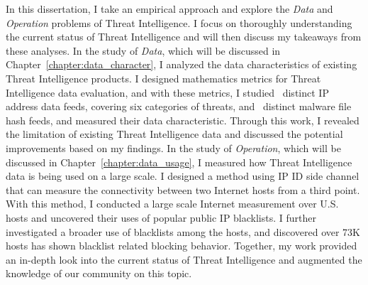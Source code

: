 In this dissertation, I take an empirical approach and explore the 
\textit{Data} and \textit{Operation} problems of Threat Intelligence.
I focus on thoroughly understanding the current status of Threat 
Intelligence and will then discuss my takeaways from these analyses.
In the study of \textit{Data}, which will be discussed in Chapter~\ref{chapter:data_character}, 
I analyzed the data characteristics of existing Threat Intelligence products.
I designed mathematics metrics for Threat Intelligence data evaluation,
and with these metrics, I studied \numipfeeds\ distinct IP address 
data feeds, covering six categories of threats, and \numhashfeeds\ distinct
malware file hash feeds, and measured their data characteristic. Through this
work, I revealed the limitation of existing Threat Intelligence data and 
discussed the potential improvements based on my findings. In the study of
\textit{Operation}, which will be discussed in Chapter~\ref{chapter:data_usage},
I measured how Threat Intelligence data is being used on a large scale. 
I designed a method using IP ID side channel that can measure the 
connectivity between two Internet hosts from a third point. With this 
method, I conducted a large scale Internet measurement over {} 
U.S. hosts and uncovered their uses of {\blacklistnum} popular public IP
blacklists. I further investigated a broader use of blacklists among the 
hosts, and discovered over 73K hosts has shown blacklist related blocking 
behavior. Together, my work provided an in-depth look into the current
status of Threat Intelligence and augmented the knowledge of our community
on this topic.

